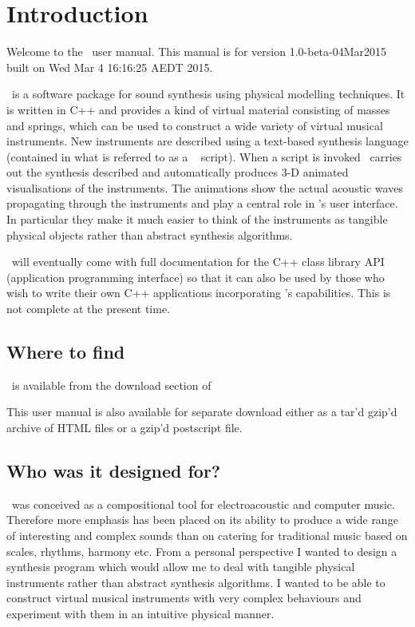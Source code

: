 \chapter{Introduction}
Welcome to the \tao\ user manual. This manual is for version
1.0-beta-04Mar2015 built on Wed Mar  4 16:16:25 AEDT 2015.

\tao\ is a software package for sound synthesis
using physical modelling techniques. It is written in C++ and provides
a kind of virtual material consisting of masses and springs, which can be
used to construct a wide variety of virtual musical instruments. New
instruments are described using a text-based synthesis language (contained
in what is referred to as a \tao\  script). When a script is
invoked \tao\ carries out the synthesis described and automatically
produces 3-D animated visualisations of the instruments. The animations
show the actual acoustic waves propagating through the instruments
and play a central role in \tao's user interface. In particular they
make it much easier to think of the instruments as tangible physical
objects rather than abstract synthesis algorithms.

\tao\ will eventually come with full documentation for the C++ class
library API (application programming interface) so that it can also
be used by those who wish to write their own C++ applications
incorporating \tao's capabilities. This is not complete at the present
time.

\section{Where to find \tao}
\tao\ is available from the download section of \TaoWebSite

This user manual is also available for separate download either as a
tar'd gzip'd archive of HTML files or a gzip'd postscript file.

\section{Who was it designed for?}
\tao\ was conceived as a compositional tool for electroacoustic and
computer music. Therefore more emphasis has been placed on its ability
to produce a wide range of interesting and complex sounds than on
catering for traditional music based on scales, rhythms, harmony etc.
From a personal perspective I wanted to design a synthesis program
which would allow me to deal with tangible physical instruments
rather than abstract synthesis algorithms. I wanted to be able to
construct virtual musical instruments with very complex behaviours and
experiment with them in an intuitive physical manner.

